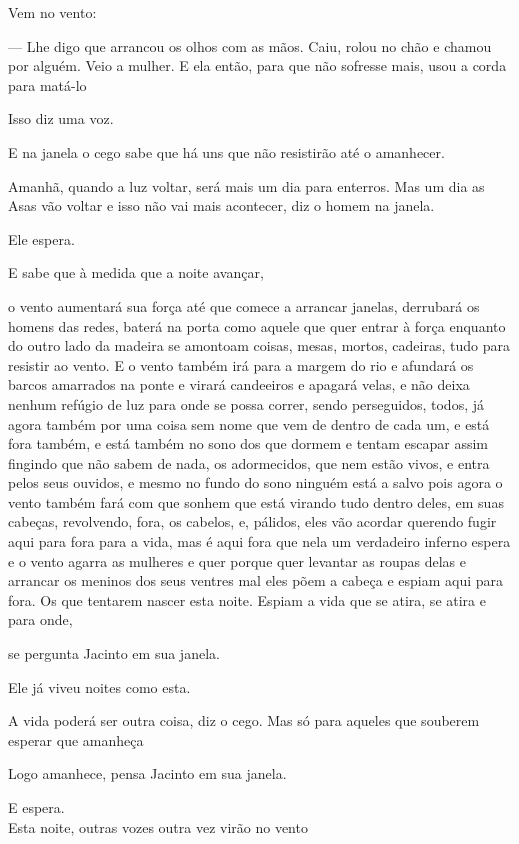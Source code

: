 Vem no vento:

--- Lhe digo que arrancou os olhos com as mãos. Caiu, rolou no chão e
chamou por alguém. Veio a mulher. E ela então, para que não sofresse
mais, usou a corda para matá-lo

Isso diz uma voz.

E na janela o cego sabe que há uns que não resistirão até o amanhecer.

Amanhã, quando a luz voltar, será mais um dia para enterros. Mas um dia
as Asas vão voltar e isso não vai mais acontecer, diz o homem na janela.

Ele espera.

E sabe que à medida que a noite avançar,

o vento aumentará sua força até que comece a arrancar janelas, derrubará
os homens das redes, baterá na porta como aquele que quer entrar à força
enquanto do outro lado da madeira se amontoam coisas, mesas, mortos,
cadeiras, tudo para resistir ao vento. E o vento também irá para a
margem do rio e afundará os barcos amarrados na ponte e virará
candeeiros e apagará velas, e não deixa nenhum refúgio de luz para onde
se possa correr, sendo perseguidos, todos, já agora também por uma coisa
sem nome que vem de dentro de cada um, e está fora também, e está também
no sono dos que dormem e tentam escapar assim fingindo que não sabem de
nada, os adormecidos, que nem estão vivos, e entra pelos seus ouvidos, e
mesmo no fundo do sono ninguém está a salvo pois agora o vento também
fará com que sonhem que está virando tudo dentro deles, em suas cabeças,
revolvendo, fora, os cabelos, e, pálidos, eles vão acordar querendo
fugir aqui para fora para a vida, mas é aqui fora que nela um verdadeiro
inferno espera e o vento agarra as mulheres e quer porque quer levantar
as roupas delas e arrancar os meninos dos seus ventres mal eles põem a
cabeça e espiam aqui para fora. Os que tentarem nascer esta noite.
Espiam a vida que se atira, se atira e para onde,

se pergunta Jacinto em sua janela.

Ele já viveu noites como esta.

A vida poderá ser outra coisa, diz o cego. Mas só para aqueles que
souberem esperar que amanheça

Logo amanhece, pensa Jacinto em sua janela.

E espera.\\

Esta noite, outras vozes outra vez virão no vento\\

